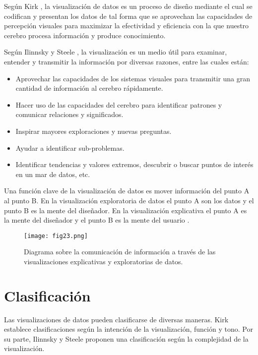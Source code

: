 Según Kirk \cite{Kir12}, la visualización de datos es un proceso de diseño mediante el cual se codifican y presentan los datos de tal forma que se aprovechan las capacidades de percepción visuales para maximizar la efectividad y eficiencia con la que nuestro cerebro procesa información y produce conocimiento.

Según Ilinnsky y Steele \cite{Ste11}, la visualización es un medio útil para examinar, entender y transmitir la información por diversas razones, entre las cuales están:

\begin{itemize}
  \item Aprovechar las capacidades de los sistemas visuales para transmitir una gran cantidad de información al cerebro rápidamente.
  \item Hacer uso de las capacidades del cerebro para identificar patrones y comunicar relaciones y significados.
  \item Inspirar mayores exploraciones y nuevas preguntas.
  \item Ayudar a identificar sub-problemas.
  \item Identificar tendencias y valores extremos, descubrir o buscar puntos de interés en un mar de datos, etc.
\end{itemize}

Una función clave de la visualización de datos es mover información del punto A al punto B. En la visualización exploratoria de datos el punto A son los datos y el punto B es la mente del diseñador. En la visualización explicativa el punto A es la mente del diseñador y el punto B es la mente del usuario .

\begin{figure}[htp]
  \centering
  \texttt{[image: fig23.png]}
  \caption[Diagrama sobre la comunicación de información a través de las visualizaciones de datos]{Diagrama sobre la comunicación de información a través de las visualizaciones explicativas y exploratorias de datos.}
  \label{fig:fig23}
\end{figure}

\section{Clasificación}
Las visualizaciones de datos pueden clasificarse de diversas maneras. Kirk \cite{Kir12} establece clasificaciones según la intención de la visualización, función y tono. Por su parte, Ilinnsky y Steele \cite{Ste11} proponen una clasificación según la complejidad de la visualización.

